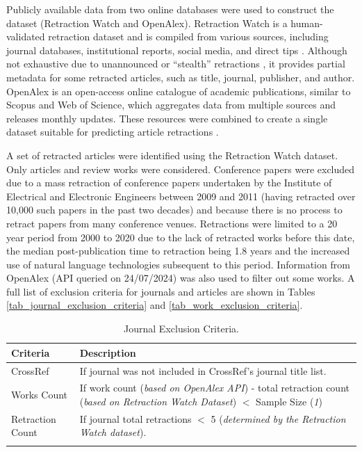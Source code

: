 \documentclass[pdflatex,sn-mathphys-num]{sn-jnl}
\begin{document}
Publicly available data from two online databases were used to construct the dataset (Retraction Watch and OpenAlex). Retraction Watch is a human-validated retraction dataset and is compiled from various sources, including journal databases, institutional reports, social media, and direct tips \cite{retraction_watch_retraction_2024, retraction_watch_retraction_2024-1}. Although not exhaustive due to unannounced or ``stealth'' retractions \cite{teixeira_da_silva_silent_2016}, it provides partial metadata for some retracted articles, such as title, journal, publisher, and author. OpenAlex is an open-access online catalogue of academic publications, similar to Scopus and Web of Science, which aggregates data from multiple sources and releases monthly updates. These resources were combined to create a single dataset suitable for predicting article retractions \cite{priem_openalex_2022}.

A set of retracted articles were identified using the Retraction Watch dataset. Only articles and review works were considered. Conference papers were excluded due to a mass retraction of conference papers undertaken by the Institute of Electrical and Electronic Engineers between 2009 and 2011 (having retracted over 10,000 such papers in the past two decades) \cite{van_noorden_more_2023} and because there is no process to retract papers from many conference venues. Retractions were limited to a 20 year period from 2000 to 2020 due to the lack of retracted works before this date, the median post-publication time to retraction being 1.8 years \cite{gaudino_trends_2021} and the increased use of natural language technologies subsequent to this period. Information from OpenAlex (API queried on 24/07/2024) was also used to filter out some works. A full list of exclusion criteria for journals and articles are shown in Tables \ref{tab_journal_exclusion_criteria} and \ref{tab_work_exclusion_criteria}.


\begin{table}
	\caption{Journal Exclusion Criteria.\label{tab_journal_exclusion_criteria}}
	\begin{tabularx}{\textwidth}{lX}
		\toprule
		\textbf{Criteria} & \textbf{Description}                                                                                                                                \\
		\midrule
		CrossRef          & If journal was not included in CrossRef's journal title list.                                                                                       \\
		Works Count       & If work count (\textit{based on OpenAlex API}) - total retraction count (\textit{based on Retraction Watch Dataset}) \(<\) Sample Size (\textit{1}) \\
		Retraction Count  & If journal total retractions \(<\) 5 (\textit{determined by the Retraction Watch dataset}).                                                         \\

		\bottomrule
		\label{tab:Journals_Criteria}
	\end{tabularx}
\end{table}
\end{document}

